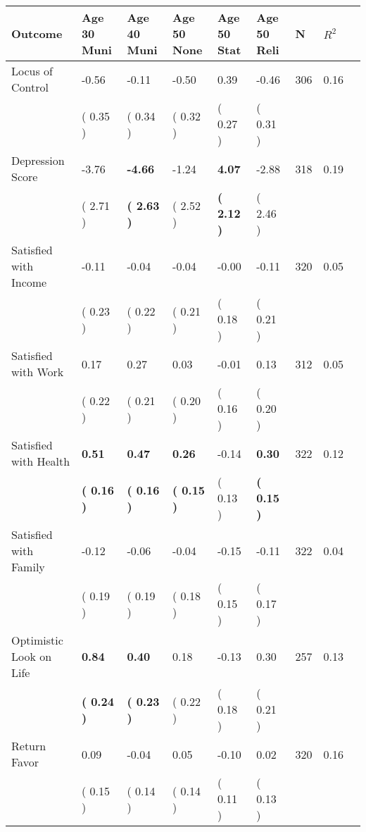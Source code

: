 \begin{tabular}{L{6.2cm} C{1.8cm} C{1.8cm} C{1.8cm} C{1.8cm} C{1.8cm} C{1.8cm} C{0.3cm} C{0.3cm}}
\toprule
 \textbf{Outcome} & \textbf{Age 30 Muni} & \textbf{Age 40 Muni} & \textbf{Age 50 None} & \textbf{Age 50 Stat} & \textbf{Age 50 Reli} & \textbf{N} & \textbf{$ R^2$} \\
\midrule
Locus of Control &     -0.56 &     -0.11 &     -0.50 &      0.39 &     -0.46  & 306 &       0.16 \\ 
 & (     0.35 ) & (     0.34 ) & (     0.32 ) & (     0.27 ) & (     0.31 )  & \\
Depression Score &     -3.76 & \textbf{    -4.66} &     -1.24 & \textbf{     4.07} &     -2.88  & 318 &       0.19 \\ 
 & (     2.71 ) & \textbf{(     2.63 )} & (     2.52 ) & \textbf{(     2.12 )} & (     2.46 )  & \\
Satisfied with Income &     -0.11 &     -0.04 &     -0.04 &     -0.00 &     -0.11  & 320 &       0.05 \\ 
 & (     0.23 ) & (     0.22 ) & (     0.21 ) & (     0.18 ) & (     0.21 )  & \\
Satisfied with Work &      0.17 &      0.27 &      0.03 &     -0.01 &      0.13  & 312 &       0.05 \\ 
 & (     0.22 ) & (     0.21 ) & (     0.20 ) & (     0.16 ) & (     0.20 )  & \\
Satisfied with Health & \textbf{     0.51} & \textbf{     0.47} & \textbf{     0.26} &     -0.14 & \textbf{     0.30}  & 322 &       0.12 \\ 
 & \textbf{(     0.16 )} & \textbf{(     0.16 )} & \textbf{(     0.15 )} & (     0.13 ) & \textbf{(     0.15 )}  & \\
Satisfied with Family &     -0.12 &     -0.06 &     -0.04 &     -0.15 &     -0.11  & 322 &       0.04 \\ 
 & (     0.19 ) & (     0.19 ) & (     0.18 ) & (     0.15 ) & (     0.17 )  & \\
Optimistic Look on Life & \textbf{     0.84} & \textbf{     0.40} &      0.18 &     -0.13 &      0.30  & 257 &       0.13 \\ 
 & \textbf{(     0.24 )} & \textbf{(     0.23 )} & (     0.22 ) & (     0.18 ) & (     0.21 )  & \\
Return Favor &      0.09 &     -0.04 &      0.05 &     -0.10 &      0.02  & 320 &       0.16 \\ 
 & (     0.15 ) & (     0.14 ) & (     0.14 ) & (     0.11 ) & (     0.13 )  & \\

\end{tabular}
